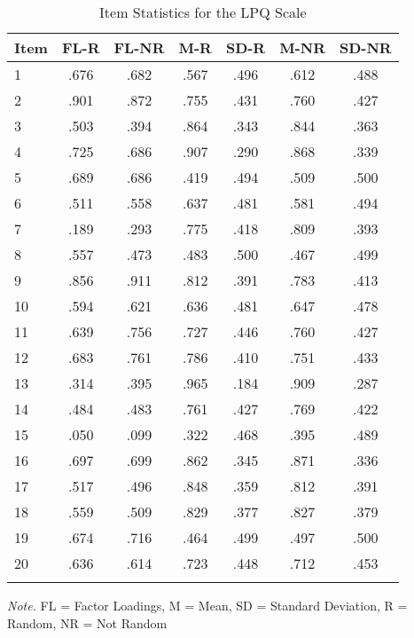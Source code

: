 \documentclass[english,man, mask]{apa6}
\theoremstyle{definition}
\theoremstyle{definition}
\theoremstyle{definition}
\theoremstyle{remark}
\begin{document}
\begin{table}[tbp]
\begin{center}
\begin{threeparttable}
\caption{\label{tab:Ltable}Item Statistics for the LPQ Scale}
\begin{tabular}{lcccccc}
\toprule
Item & \multicolumn{1}{c}{FL-R} & \multicolumn{1}{c}{FL-NR} & \multicolumn{1}{c}{M-R} & \multicolumn{1}{c}{SD-R} & \multicolumn{1}{c}{M-NR} & \multicolumn{1}{c}{SD-NR}\\
\midrule
1 & .676 & .682 & .567 & .496 & .612 & .488\\
2 & .901 & .872 & .755 & .431 & .760 & .427\\
3 & .503 & .394 & .864 & .343 & .844 & .363\\
4 & .725 & .686 & .907 & .290 & .868 & .339\\
5 & .689 & .686 & .419 & .494 & .509 & .500\\
6 & .511 & .558 & .637 & .481 & .581 & .494\\
7 & .189 & .293 & .775 & .418 & .809 & .393\\
8 & .557 & .473 & .483 & .500 & .467 & .499\\
9 & .856 & .911 & .812 & .391 & .783 & .413\\
10 & .594 & .621 & .636 & .481 & .647 & .478\\
11 & .639 & .756 & .727 & .446 & .760 & .427\\
12 & .683 & .761 & .786 & .410 & .751 & .433\\
13 & .314 & .395 & .965 & .184 & .909 & .287\\
14 & .484 & .483 & .761 & .427 & .769 & .422\\
15 & .050 & .099 & .322 & .468 & .395 & .489\\
16 & .697 & .699 & .862 & .345 & .871 & .336\\
17 & .517 & .496 & .848 & .359 & .812 & .391\\
18 & .559 & .509 & .829 & .377 & .827 & .379\\
19 & .674 & .716 & .464 & .499 & .497 & .500\\
20 & .636 & .614 & .723 & .448 & .712 & .453\\
\bottomrule
\addlinespace
\end{tabular}
\begin{tablenotes}[para]
\textit{Note.} FL = Factor Loadings, M = Mean, SD = Standard Deviation, R = Random, NR = Not Random
\end{tablenotes}
\end{threeparttable}
\end{center}
\end{table}
\end{document}
